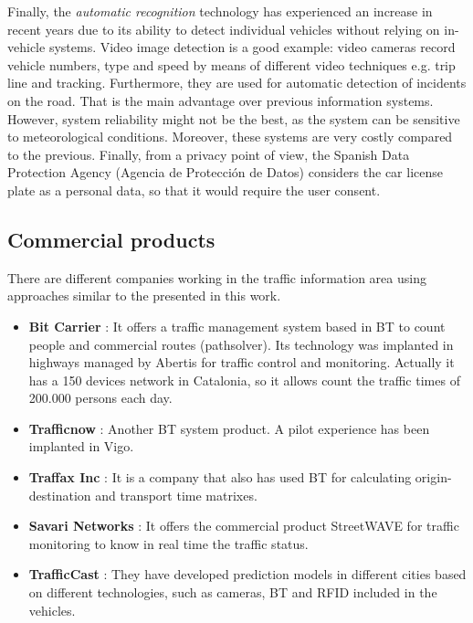 \documentclass{llncs}
\begin{document}
Finally, the \emph{automatic recognition} technology has experienced an increase in recent years due to its ability to detect individual vehicles without relying on in-vehicle systems. 
Video image detection is a good example: video cameras record vehicle numbers, type and speed by means of different video techniques e.g. trip line and tracking. 
Furthermore, they are used for automatic detection of incidents on the road. 
That is the main advantage over previous information systems.
However, system reliability might not be the best, as the system can be sensitive to meteorological conditions.
Moreover, these systems are very costly compared to the previous.
Finally, from a privacy point of view, the Spanish Data Protection Agency (Agencia de Protección de Datos) considers the car license plate as a personal data, so that it would require the user consent.




\subsection{Commercial products}
There are different companies working in the traffic information area using approaches similar to the presented in this work.

\begin{itemize}

\item \textbf{Bit Carrier} \cite{patenteBC} \cite{BitCarrier}: It offers a traffic management system based in BT to count people and commercial routes (pathsolver). Its technology was implanted in highways managed by Abertis for traffic control and monitoring. Actually it has a 150 devices network in Catalonia, so it allows count the traffic times of 200.000 persons each day.
 
\item \textbf{Trafficnow} \cite{Trafficnow}: Another BT system product. A pilot experience has been implanted in Vigo.

 \item \textbf{Traffax Inc} \cite{TraffaxInc}: It is a company that also has used BT for calculating origin-destination and transport time matrixes.

 \item \textbf{Savari Networks} \cite{SavariNetworks}: It offers the commercial product StreetWAVE for traffic monitoring to know in real time the traffic status.


 \item \textbf{TrafficCast} \cite{TrafficCast}: They have developed prediction models in different cities based on different technologies, such as cameras, BT and RFID included in the vehicles.

\end{itemize}
\end{document}
